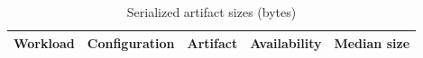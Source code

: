 \begin{table}[htbp]
\centering
\caption{Serialized artifact sizes (bytes)}
\label{tab:evaluation-artifacts}
\begin{tabular}{llllr}
\hline
Workload & Configuration & Artifact & Availability & Median size \\
\hline
\hline
\end{tabular}
\par{}
\end{table}

